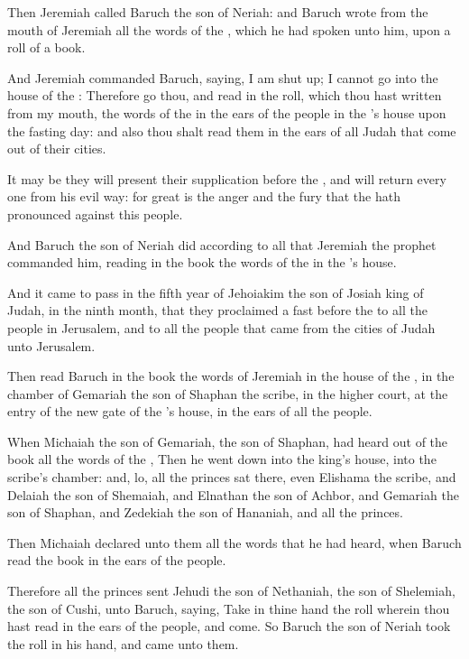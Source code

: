 \verse Then Jeremiah called Baruch the son of Neriah: and Baruch wrote from the mouth of Jeremiah all the words of the \LORD, which he had spoken unto him, upon a roll of a book.

\verse And Jeremiah commanded Baruch, saying, I am shut up; I cannot go into the house of the \LORD: \verse Therefore go thou, and read in the roll, which thou hast written from my mouth, the words of the \LORD in the ears of the people in the \LORD's house upon the fasting day: and also thou shalt read them in the ears of all Judah that come out of their cities.

\verse It may be they will present their supplication before the \LORD, and will return every one from his evil way: for great is the anger and the fury that the \LORD hath pronounced against this people.

\verse And Baruch the son of Neriah did according to all that Jeremiah the prophet commanded him, reading in the book the words of the \LORD in the \LORD's house.

\verse And it came to pass in the fifth year of Jehoiakim the son of Josiah king of Judah, in the ninth month, that they proclaimed a fast before the \LORD to all the people in Jerusalem, and to all the people that came from the cities of Judah unto Jerusalem.

\verse Then read Baruch in the book the words of Jeremiah in the house of the \LORD, in the chamber of Gemariah the son of Shaphan the scribe, in the higher court, at the entry of the new gate of the \LORD's house, in the ears of all the people.

\verse When Michaiah the son of Gemariah, the son of Shaphan, had heard out of the book all the words of the \LORD, \verse Then he went down into the king's house, into the scribe's chamber: and, lo, all the princes sat there, even Elishama the scribe, and Delaiah the son of Shemaiah, and Elnathan the son of Achbor, and Gemariah the son of Shaphan, and Zedekiah the son of Hananiah, and all the princes.

\verse Then Michaiah declared unto them all the words that he had heard, when Baruch read the book in the ears of the people.

\verse Therefore all the princes sent Jehudi the son of Nethaniah, the son of Shelemiah, the son of Cushi, unto Baruch, saying, Take in thine hand the roll wherein thou hast read in the ears of the people, and come. So Baruch the son of Neriah took the roll in his hand, and came unto them.

